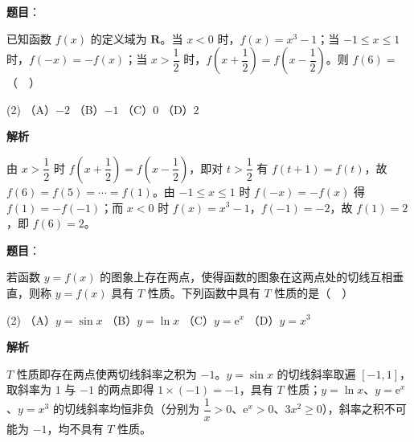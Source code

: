 \begin{answer}

\textbf{题目}：

已知函数 \(f(x)\) 的定义域为 \(\mathbf{R}\)。当 \(x<0\) 时，\(f(x)=x^{3}-1\)；当 \(-1\leqslant x\leqslant 1\) 时，\(f(-x)=-f(x)\)；当 \(x>\dfrac{1}{2}\) 时，\(f\left(x+\dfrac{1}{2}\right)=f\left(x-\dfrac{1}{2}\right)\)。则 \(f(6)=\)（　）

\begin{gkopts}(2)
\task （A）\(-2\)
\task （B）\(-1\)
\task （C）\(0\)
\task （D）\(2\)
\end{gkopts}

\textbf{解析}

由 \(x>\dfrac{1}{2}\) 时 \(f\left(x+\dfrac{1}{2}\right)=f\left(x-\dfrac{1}{2}\right)\)，即对 \(t>\dfrac{1}{2}\) 有 \(f(t+1)=f(t)\)，故 \(f(6)=f(5)=\cdots=f(1)\)。由 \(-1\leqslant x\leqslant 1\) 时 \(f(-x)=-f(x)\) 得 \(f(1)=-f(-1)\)；而 \(x<0\) 时 \(f(x)=x^{3}-1\)，\(f(-1)=-2\)，故 \(f(1)=2\)，即 \(f(6)=2\)。


\end{answer}
\begin{answer}

\textbf{题目}：

若函数 \(y=f(x)\) 的图象上存在两点，使得函数的图象在这两点处的切线互相垂直，则称 \(y=f(x)\) 具有 \(T\) 性质。下列函数中具有 \(T\) 性质的是（　）

\begin{gkopts}(2)
\task （A）\(y=\sin x\)
\task （B）\(y=\ln x\)
\task （C）\(y=\mathrm{e}^{x}\)
\task （D）\(y=x^{3}\)
\end{gkopts}

\textbf{解析}

\(T\) 性质即存在两点使两切线斜率之积为 \(-1\)。\(y=\sin x\) 的切线斜率取遍 \([-1,1]\)，取斜率为 \(1\) 与 \(-1\) 的两点即得 \(1\times(-1)=-1\)，具有 \(T\) 性质；\(y=\ln x\)、\(y=\mathrm{e}^{x}\)、\(y=x^{3}\) 的切线斜率均恒非负（分别为 \(\dfrac{1}{x}>0\)、\(\mathrm{e}^{x}>0\)、\(3x^{2}\geqslant 0\)），斜率之积不可能为 \(-1\)，均不具有 \(T\) 性质。


\end{answer}
